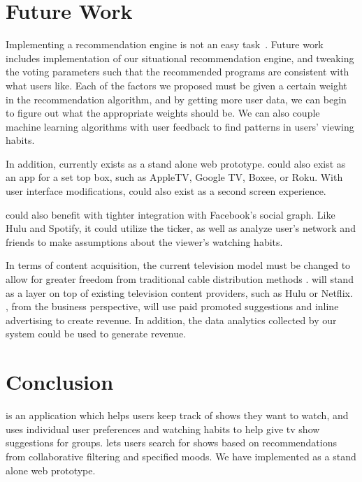 \section{Future Work}
Implementing a recommendation engine is not an easy task~\cite{netflix}.  Future work
includes implementation of our situational recommendation engine, and
tweaking the voting parameters such that the recommended programs are
consistent with what users like.  Each of the factors we proposed must
be given a certain weight in the recommendation algorithm, and by
getting more user data, we can begin to figure out what the
appropriate weights should be.  We can also couple machine learning
algorithms with user feedback to find patterns in users' viewing
habits.

In addition, {\sys} currently exists as a stand alone web prototype.  {\sys}
could also exist as an app for a set top box, such as AppleTV, Google
TV, Boxee, or Roku.  With user interface modifications, {\sys} could
also exist as a second screen experience.

{\sys} could also benefit with tighter integration with Facebook's
social graph.  Like Hulu and Spotify, it could utilize the ticker, as
well as analyze user's network and friends to make assumptions about
the viewer's watching habits.

In terms of content acquisition, the current television model must be
changed to allow for greater freedom from traditional cable
distribution methods \cite{montpetit}.  {\sys} will stand as a layer
on top of existing television content providers, such as Hulu or
Netflix.  {\sys}, from the business perspective, will use paid
promoted suggestions and inline advertising to create revenue.  In
addition, the data analytics collected by our system could be used to
generate revenue.

\section{Conclusion}

{\sys} is an application which helps users keep track of shows they
want to watch, and uses individual user preferences and watching
habits to help give tv show suggestions for groups.  {\sys} lets
users search for shows based on recommendations from collaborative
filtering and specified moods.  We have implemented {\sys} as a stand
alone web prototype.

